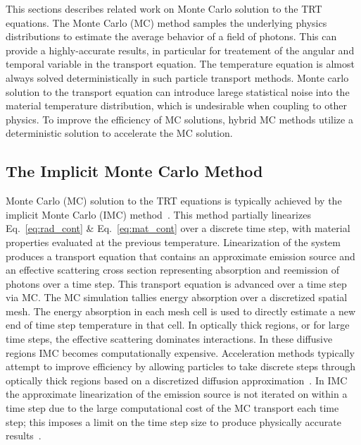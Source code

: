 This sections describes related work on Monte Carlo solution to the TRT equations.  The
Monte Carlo (MC) method samples the underlying physics distributions to estimate the
average behavior of a field of photons.  This can provide a highly-accurate results, in
particular for treatement of the angular and temporal variable in the transport equation.  The
temperature equation is almost always solved deterministically in such particle transport
methods. Monte carlo solution to the transport equation can introduce larege statistical
noise into the material temperature distribution, which is undesirable when coupling to
other physics.  To improve the efficiency of MC solutions, hybrid MC methods utilize a
deterministic solution to accelerate the MC solution.  

\subsection{The Implicit Monte Carlo Method}

Monte Carlo (MC) solution to the TRT equations is typically achieved by the 
implicit Monte Carlo (IMC) method~\cite{fnc}. This
method partially linearizes Eq.~\eqref{eq:rad_cont} \& Eq.~\eqref{eq:mat_cont} over a discrete time
step, with material properties evaluated at the previous temperature.  Linearization of
the system produces a transport equation that contains an approximate emission source and
an effective scattering cross section representing absorption and reemission of photons
over a time step. This transport equation is advanced over a time step via MC. The MC
simulation tallies energy absorption over a discretized spatial mesh.  The energy
absorption in each mesh cell is used to directly estimate a new end of time step
temperature in that cell.  In optically thick regions, or for large time steps, the
effective scattering dominates interactions.  In these diffusive regions IMC becomes
computationally expensive. Acceleration methods typically attempt to improve efficiency by
allowing particles to take discrete steps through optically thick regions based on a
discretized diffusion approximation~\cite{imd,ddmc}.  In IMC the approximate linearization
of the emission source is not iterated on within a time step due to the large
computational cost of the MC transport each time step; this imposes a limit on the time
step size to produce physically accurate results~\cite{wollaber2013discrete}. 

